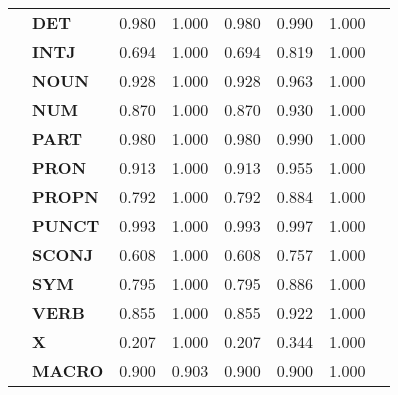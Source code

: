 \begin{longtable}{|l||l||l||l||l||l||l||l|}
\textbf{} & \textbf{DET} & 0.980 & 1.000 & 0.980 & 0.990 & 1.000 \\
\textbf{} & \textbf{INTJ} & 0.694 & 1.000 & 0.694 & 0.819 & 1.000 \\
\textbf{} & \textbf{NOUN} & 0.928 & 1.000 & 0.928 & 0.963 & 1.000 \\
\textbf{} & \textbf{NUM} & 0.870 & 1.000 & 0.870 & 0.930 & 1.000 \\
\textbf{} & \textbf{PART} & 0.980 & 1.000 & 0.980 & 0.990 & 1.000 \\
\textbf{} & \textbf{PRON} & 0.913 & 1.000 & 0.913 & 0.955 & 1.000 \\
\textbf{} & \textbf{PROPN} & 0.792 & 1.000 & 0.792 & 0.884 & 1.000 \\
\textbf{} & \textbf{PUNCT} & 0.993 & 1.000 & 0.993 & 0.997 & 1.000 \\
\textbf{} & \textbf{SCONJ} & 0.608 & 1.000 & 0.608 & 0.757 & 1.000 \\
\textbf{} & \textbf{SYM} & 0.795 & 1.000 & 0.795 & 0.886 & 1.000 \\
\textbf{} & \textbf{VERB} & 0.855 & 1.000 & 0.855 & 0.922 & 1.000 \\
\textbf{} & \textbf{X} & 0.207 & 1.000 & 0.207 & 0.344 & 1.000 \\
\textbf{} & \textbf{MACRO} & 0.900 & 0.903 & 0.900 & 0.900 & 1.000 \\
\cline{1-7}
\end{longtable}
